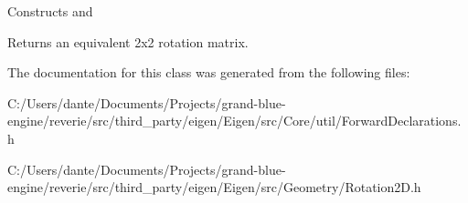 Constructs and \begin{DoxyReturn}{Returns}
an equivalent 2x2 rotation matrix. 
\end{DoxyReturn}


The documentation for this class was generated from the following files\+:\begin{DoxyCompactItemize}
\item 
C\+:/\+Users/dante/\+Documents/\+Projects/grand-\/blue-\/engine/reverie/src/third\+\_\+party/eigen/\+Eigen/src/\+Core/util/Forward\+Declarations.\+h\item 
C\+:/\+Users/dante/\+Documents/\+Projects/grand-\/blue-\/engine/reverie/src/third\+\_\+party/eigen/\+Eigen/src/\+Geometry/Rotation2\+D.\+h\end{DoxyCompactItemize}

